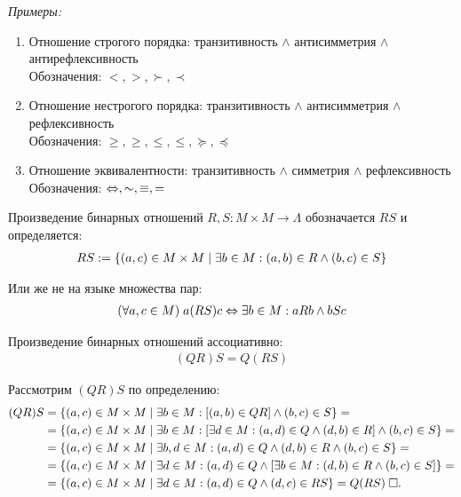 \documentclass{article}
\begin{document}
{\it Примеры:}
\begin{enumerate}
	\item Отношение строгого порядка: транзитивность $\land$ антисимметрия $\land$ антирефлексивность\\
	      Обозначения: $<, >, \succ, \prec$
	\item Отношение нестрогого порядка: транзитивность $\land$ антисимметрия $\land$ рефлексивность\\
	      Обозначения: $\ge, \geqslant, \le, \leqslant, \succeq, \preceq$
	\item Отношение эквивалентности: транзитивность $\land$ симметрия $\land$ рефлексивность\\
	      Обозначения: $\Leftrightarrow, \sim, \equiv, =$
\end{enumerate}

\pagebreak


Произведение бинарных отношений $R,S:M\times M\to\Lambda$ обозначается $RS$ и определяется:
\begin{align*}
	RS:=\{(a, c)\in M\times M\;|\;\exists b \in M: (a,b)\in R \land (b,c)\in S\}
\end{align*}

Или же не на языке множества пар:
\begin{align*}
	(\forall a,c\in M)\;a(RS)c\Leftrightarrow \exists b\in M:aRb\land bSc
\end{align*}

\theorem

Произведение бинарных отношений ассоциативно:
\begin{align*}
	(QR)S=Q(RS)
\end{align*}

\proof

Рассмотрим $(QR)S$ по определению:
\begin{align*}
	(QR)S
	 & =\{(a,c)\in M\times M\;|\;\exists b\in M:[(a,b)\in QR]\land (b,c)\in S\}=                               \\
	 & =\{(a,c)\in M\times M\;|\;\exists b\in M:[\exists d\in M:(a,d)\in Q\land (d,b)\in R]\land (b,c)\in S\}= \\
	 & =\{(a,c)\in M\times M\;|\;\exists b,d\in M:(a,d)\in Q\land (d,b)\in R\land (b,c)\in S\}=                \\
	 & =\{(a,c)\in M\times M\;|\;\exists d\in M:(a,d)\in Q\land [\exists b\in M:(d,b)\in R\land (b,c)\in S]\}= \\
	 & =\{(a,c)\in M\times M\;|\;\exists d\in M:(a,d)\in Q\land (d,c)\in RS\}=Q(RS)\;\square.
\end{align*}
\end{document}
